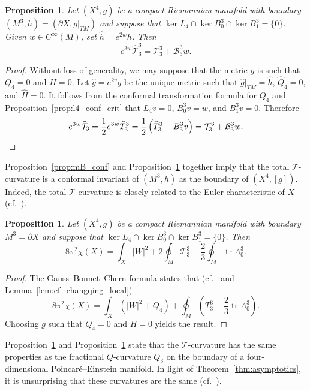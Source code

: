 \documentclass{amsart}
\newtheorem{prop}[thm]{Proposition}
\theoremstyle{definition}
\theoremstyle{remark}
\numberwithin{equation}{section}
\begin{document}
\begin{prop}
 \label{prop:mT_conf}
 Let $(X^4,g)$ be a compact Riemannian manifold with boundary $(M^3,h)=(\partial X,g{\rvert}_{TM})$ and suppose that $\ker L_4\cap\ker B_0^3\cap\ker B_1^3=\{0\}$.  Given $w\in C^\infty(M)$, set ${\widehat{h}}=e^{2w}h$.  Then
 \[ e^{3w}{\widehat{\mathcal{T}}}_3^3 = {\mathcal{T}}_3^3 + {\mathcal{B}}_3^3w . \]
\end{prop}

\begin{proof}
 Without loss of generality, we may suppose that the metric $g$ is such that $Q_4=0$ and $H=0$.  Let ${\widehat{g}}=e^{2v}g$ be the unique metric such that ${\widehat{g}}{\rvert}_{TM}={\widehat{h}}$, ${\widehat{Q}}_4=0$, and ${\widehat{H}}=0$.  It follows from the conformal transformation formula for $Q_4$ and Proposition~\ref{prop:l4_conf_crit} that $L_4v=0$, $B_0^3v=w$, and $B_1^3v=0$.  Therefore
 \[ e^{3w}{\widehat{\mathcal{T}}}_3 = \frac{1}{2}e^{3w}{\widehat{T}}_3^3 = \frac{1}{2}\left({\widehat{T}}_3^3 + B_3^3v\right) = {\mathcal{T}}_3^3 + {\mathcal{B}}_3^3w . \qedhere \]
\end{proof}

Proposition~\ref{prop:mB_conf} and Proposition~\ref{prop:mT_conf} together imply that the total ${\mathcal{T}}$-curvature is a conformal invariant of $(M^3,h)$ as the boundary of $(X^4,[g])$.  Indeed, the total ${\mathcal{T}}$-curvature is closely related to the Euler characteristic of $X$ (cf.\ \cite{Anderson2001b,ChangQingYang2006}).

\begin{prop}
 \label{prop:mT_gauss_bonnet}
 Let $(X^4,g)$ be a compact Riemannian manifold with boundary $M^3=\partial X$ and suppose that $\ker L_4\cap\ker B_0^3\cap\ker B_1^3=\{0\}$.  Then
 \[ 8\pi^2\chi(X) = \int_X {\lvert} W{\rvert}^2 + 2\oint_M {\mathcal{T}}_3^3 - \frac{2}{3}\oint_M \operatorname{tr} A_0^3 . \]
\end{prop}

\begin{proof}
 The Gauss--Bonnet--Chern formula states that (cf.\ \cite{ChangQing1997a} and Lemma~\ref{lem:cf_changqing_local})
 \[ 8\pi^2\chi(X) = \int_X \left( {\lvert} W{\rvert}^2 + Q_4\right) + \oint_M \left(T_3^3 - \frac{2}{3}\operatorname{tr} A_0^3\right) . \]
 Choosing $g$ such that $Q_4=0$ and $H=0$ yields the result.
\end{proof}

Proposition~\ref{prop:mT_conf} and Proposition~\ref{prop:mT_gauss_bonnet} state that the ${\mathcal{T}}$-curvature has the same properties as the fractional $Q$-curvature $Q_3$ on the boundary of a four-dimensional Poincar\'e--Einstein manifold.  In light of Theorem~\ref{thm:asymptotics}, it is unsurprising that these curvatures are the same (cf.\ \cite{ChangQingYang2006}).
\end{document}
